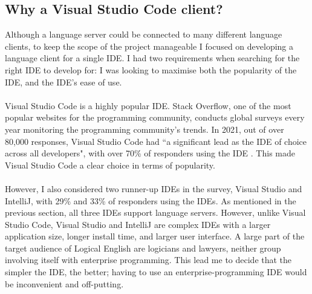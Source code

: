 \documentclass[../main.tex]{subfiles}
\begin{document}
\subsection{Why a Visual Studio Code client?}
Although a language server could be connected to many different language clients, to keep the scope of the project manageable I focused on developing a language client for a single IDE. I had two requirements when searching for the right IDE to develop for: I was looking to maximise both the popularity of the IDE, and the IDE's ease of use.
\\
\\
Visual Studio Code is a highly popular IDE. Stack Overflow, one of the most popular websites for the programming community, conducts global surveys every year monitoring the programming community's trends. In 2021, out of over 80,000 responses, Visual Studio Code had ``a significant lead as the IDE of choice across all developers", with over 70\% of responders using the IDE  \cite{ide_rankings}. This made Visual Studio Code a clear choice in terms of popularity. 
\\
\\
However, I also considered two runner-up IDEs in the survey, Visual Studio and IntelliJ, with 29\% and 33\% of responders using the IDEs. As mentioned in the previous section, all three IDEs support language servers. However, unlike Visual Studio Code, Visual Studio and IntelliJ are complex IDEs with a larger application size, longer install time, and larger user interface. A large part of the target audience of Logical English are logicians and lawyers, neither group involving itself with enterprise programming. This lead me to decide that the simpler the IDE, the better; having to use an enterprise-programming IDE would be inconvenient and off-putting. 

\end{document}
